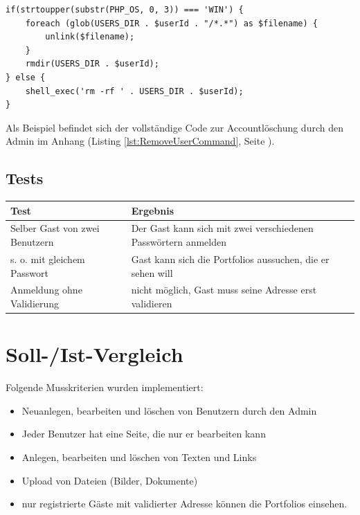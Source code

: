 \documentclass[10.5pt]{scrarticle}
\begin{document}
\lstset{firstnumber=31}
\begin{lstlisting}
if(strtoupper(substr(PHP_OS, 0, 3)) === 'WIN') {
    foreach (glob(USERS_DIR . $userId . "/*.*") as $filename) {
        unlink($filename);
    }
    rmdir(USERS_DIR . $userId);
} else {
    shell_exec('rm -rf ' . USERS_DIR . $userId);
}
\end{lstlisting}
Als Beispiel befindet sich der vollständige Code zur Accountlöschung durch den Admin im Anhang (Listing \ref{lst:RemoveUserCommand}, Seite \pageref{lst:RemoveUserCommand}).

\subsection{Tests}

\begin{table}[ht!]
\begin{tabularx}{\textwidth}{l | l}

\textbf{Test}  & \textbf{Ergebnis}\\
\hline
Selber Gast von zwei Benutzern  & Der Gast kann sich mit zwei verschiedenen Passwörtern anmelden\\
s. o. mit gleichem Passwort & Gast kann sich die Portfolios aussuchen, die er sehen will\\
Anmeldung ohne Validierung & nicht möglich, Gast muss seine Adresse erst validieren\\

\end{tabularx}
\end{table}

\section{Soll-/Ist-Vergleich}

Folgende Musskriterien wurden implementiert:

\begin{itemize}
	\item Neuanlegen, bearbeiten und löschen von Benutzern durch den Admin
	\item Jeder Benutzer hat eine Seite, die nur er bearbeiten kann
	\item Anlegen, bearbeiten und löschen von Texten und Links
	\item Upload von Dateien (Bilder, Dokumente)
	\item nur registrierte Gäste mit validierter Adresse können die Portfolios einsehen.
\end{itemize}
\end{document}
